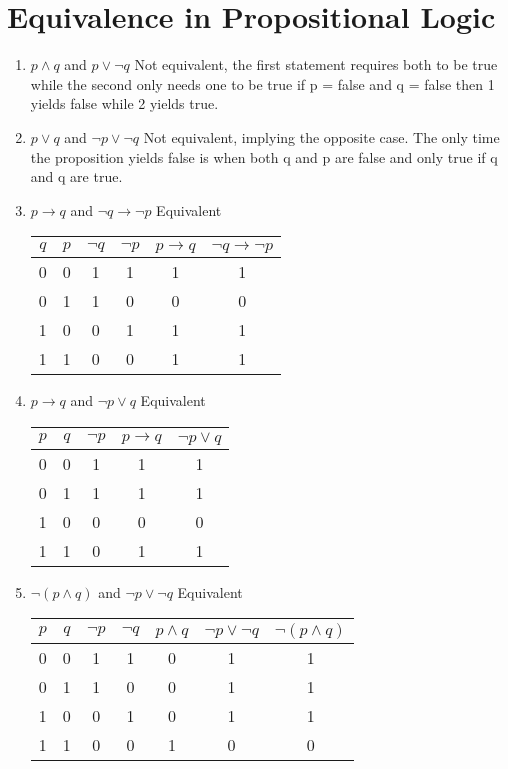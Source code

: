 \documentclass[12pt]{article}
\begin{document}
\section{Equivalence in Propositional Logic}
\begin{enumerate}
  \item $p \land q$  and  $p \lor \neg q$
  Not equivalent, the first statement requires both to be true while the second only needs one to be true if p = false and q = false then 1 yields false while 2 yields true.
  
  \item $p \lor q$  and $ \neg p \lor \neg q$
  Not equivalent, implying the opposite case. The only time the proposition yields false is when both q and p are false and only true if q and q are true.
  \item $p \rightarrow q$  and $\neg q \rightarrow \neg p$
  Equivalent
\begin{tabular}{|c|c|c|c|c|c|}
\hline
$q$ & $p$ & $ \lnot q$ & $ \lnot p$ & $p \to q$ & $ \lnot q \to  \lnot p$ \\
\hline
0 & 0 & 1 & 1 & 1 & 1 \\
0 & 1 & 1 & 0 & 0 & 0 \\
1 & 0 & 0 & 1 & 1 & 1 \\
1 & 1 & 0 & 0 & 1 & 1 \\
\hline
\end{tabular}
  \item $p \rightarrow q$  and $ \neg p \lor q$
  Equivalent
\begin{tabular}{|c|c|c|c|c|}
\hline
$p$ & $q$ & $ \lnot p$ & $p \to q$ & $ \lnot p \lor q$ \\
\hline
0 & 0 & 1 & 1 & 1 \\
0 & 1 & 1 & 1 & 1 \\
1 & 0 & 0 & 0 & 0 \\
1 & 1 & 0 & 1 & 1 \\
\hline
\end{tabular}
  \item $ \neg (p \land q)$   and $ \neg p \lor \neg q$
  Equivalent
\begin{tabular}{|c|c|c|c|c|c|c|}
\hline
$p$ & $q$ & $ \lnot p$ & $ \lnot q$ & $p \land q$ & $ \lnot p \lor \lnot q$ & $ \lnot (p \land q)$ \\
\hline
0 & 0 & 1 & 1 & 0 & 1 & 1 \\
0 & 1 & 1 & 0 & 0 & 1 & 1 \\
1 & 0 & 0 & 1 & 0 & 1 & 1 \\
1 & 1 & 0 & 0 & 1 & 0 & 0 \\
\hline
\end{tabular}
\end{enumerate}
\end{document}
